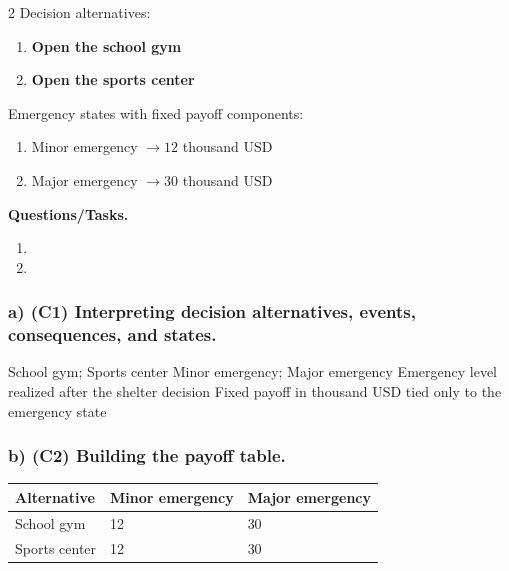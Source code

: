 	\begin{multicols}{2}
		Decision alternatives:
		\begin{enumerate}[label=\arabic*.]
			\item \textbf{Open the school gym}
			\item \textbf{Open the sports center}
		\end{enumerate}
	
			\columnbreak
	
		Emergency states with fixed payoff components:
		\begin{enumerate}[label=\arabic*.]
			\item Minor emergency $\to 12$ thousand USD
			\item Major emergency $\to 30$ thousand USD
		\end{enumerate}
	\end{multicols}

	\textbf{Questions/Tasks.}
	\begin{enumerate}[label=\textbf{\alph*)}]
		\item {}
		\item {}
	\end{enumerate}
	
	\subsubsection*{a) \textbf{(C1)} Interpreting decision alternatives, events, consequences, and states.}
	\label{subsec:problem15-neighborhood-shelter-support-c1}
	\DecisionElementsTable
	{School gym; Sports center}
	{Minor emergency; Major emergency}
	{Emergency level realized after the shelter decision}
	{Fixed payoff in thousand USD tied only to the emergency state}
	
	
	\subsubsection*{b) \textbf{(C2)} Building the payoff table.}
	\label{subsec:problem15-neighborhood-shelter-support-c2}
	\begin{center}
		\begin{tabular}{lll}
			\toprule
			Alternative & Minor emergency & Major emergency \\
			\midrule
			School gym & 12 & 30 \\
			Sports center & 12 & 30 \\
			\bottomrule
		\end{tabular}
	\end{center}
	
